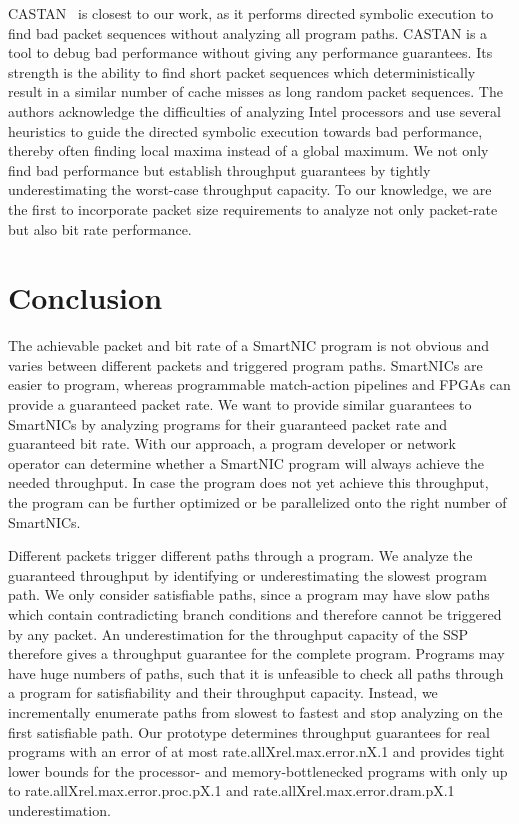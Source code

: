 \documentclass[sigconf,screen,authordraft]{acmart}
\newcommand{\mdata}[3]{%
	\csname #1X#2X#3\endcsname%
}
\begin{document}
CASTAN~\cite{castan} is closest to our work, as it performs directed symbolic execution to find bad packet sequences without analyzing all program paths.
CASTAN is a tool to debug bad performance without giving any performance guarantees.
Its strength is the ability to find short packet sequences which deterministically result in a similar number of cache misses as long random packet sequences.
The authors acknowledge the difficulties of analyzing Intel processors and use several heuristics to guide the directed symbolic execution towards bad performance, thereby often finding local maxima instead of a global maximum.
We not only find bad performance but establish throughput guarantees by tightly underestimating the worst-case throughput capacity.
To our knowledge, we are the first to incorporate packet size requirements to analyze not only packet-rate but also bit rate performance.


\section{Conclusion}
\label{sec:conclusion}

The achievable packet and bit rate of a SmartNIC program is not obvious and varies between different packets and triggered program paths.
SmartNICs are easier to program, whereas programmable match-action pipelines and FPGAs can provide a guaranteed packet rate.
We want to provide similar guarantees to SmartNICs by analyzing programs for their guaranteed packet rate and guaranteed bit rate.
With our approach, a program developer or network operator can determine whether a SmartNIC program will always achieve the needed throughput.
In case the program does not yet achieve this throughput, the program can be further optimized or be parallelized onto the right number of SmartNICs.

Different packets trigger different paths through a program.
We analyze the guaranteed throughput by identifying or underestimating the slowest program path.
We only consider satisfiable paths, since a program may have slow paths which contain contradicting branch conditions and therefore cannot be triggered by any packet.
An underestimation for the throughput capacity of the \acl{SSP} therefore gives a throughput guarantee for the complete program.
Programs may have huge numbers of paths, such that it is unfeasible to check all paths through a program for satisfiability and their throughput capacity.
Instead, we incrementally enumerate paths from slowest to fastest and stop analyzing on the first satisfiable path.
Our prototype determines throughput guarantees for real programs with an error of at most  \mdata{rate.all}{rel.max.error.n}{.1} and provides tight lower bounds for the processor- and memory-bottlenecked programs with only up to \mdata{rate.all}{rel.max.error.proc.p}{.1} and \mdata{rate.all}{rel.max.error.dram.p}{.1} underestimation.
\end{document}
